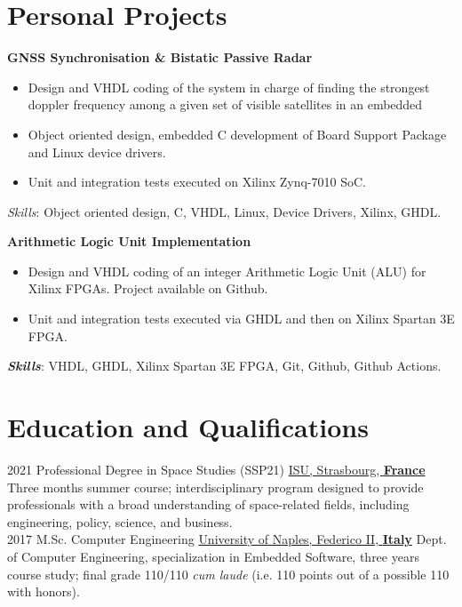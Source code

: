 \documentclass[letterpaper]{twentysecondcv} %
\begin{document}
\section{Personal Projects}

\textbf{GNSS Synchronisation \& Bistatic Passive Radar}

\begin{itemize}
    \item Design and VHDL coding of the system in charge of finding the strongest doppler frequency among a given set of visible satellites in an embedded
    \item Object oriented design, embedded C development of Board Support Package and Linux device drivers.
    \item Unit and integration tests executed on Xilinx Zynq-7010 SoC.
\end{itemize}

\textit{Skills}: Object oriented design, C, VHDL, Linux, Device Drivers, Xilinx, GHDL.

\textbf{Arithmetic Logic Unit Implementation}

\begin{itemize}
    \item Design and VHDL coding of an integer Arithmetic Logic Unit (ALU) for Xilinx FPGAs. Project available on Github.
    \item Unit and integration tests executed via GHDL and then on Xilinx Spartan 3E FPGA.
\end{itemize}

\textbf{\textit{Skills}}: VHDL, GHDL, Xilinx Spartan 3E FPGA, Git, Github, Github Actions.

\section{Education and Qualifications}
\begin{twenty}
	\twentyitem
        {2021}
    	{}
        {Professional Degree in Space Studies (SSP21)}
        {\href{https://www.isunet.edu/ssp/}{ISU, Strasbourg, \textbf{France}}}
        {}
        {
            Three months summer course; interdisciplinary program designed to provide professionals with a broad understanding of space-related fields, including engineering, policy, science, and business.
        }\\
	\twentyitem
        {2017}
    	{}
        {M.Sc. Computer Engineering}
        {\href{http://www.scuolapsb.unina.it/}{University of Naples, Federico II, \textbf{Italy}}}
        {}
        {
            Dept. of Computer Engineering, specialization in Embedded Software, three years course study; final grade 110/110 \textit{cum laude} (i.e. 110 points out of a possible 110 with honors).
        }
\end{twenty}
\end{document}

